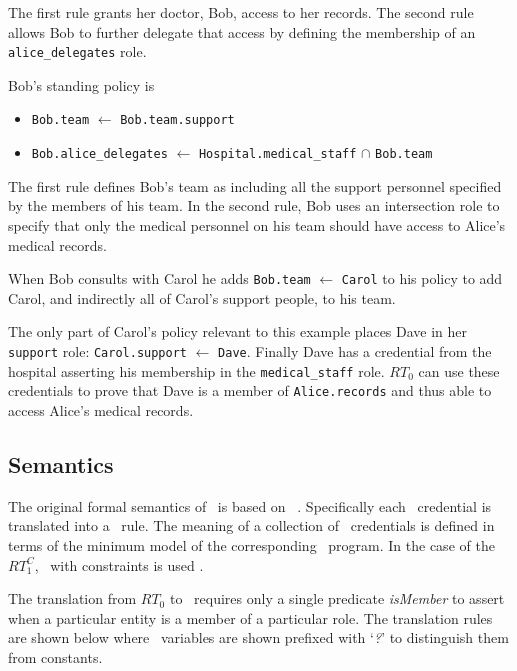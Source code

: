 The first rule grants her doctor, Bob, access to her records. The second rule allows Bob to
further delegate that access by defining the membership of an \texttt{alice\_delegates} role.

Bob's standing policy is

\begin{itemize}
\item \texttt{Bob.team} $\leftarrow$ \texttt{Bob.team.support}
\item \texttt{Bob.alice\_delegates} $\leftarrow$
  \texttt{Hospital.medical\_staff} $\cap$ \texttt{Bob.team}
\end{itemize}

The first rule defines Bob's team as including all the support personnel specified by the
members of his team. In the second rule, Bob uses an intersection role to specify that only the
medical personnel on his team should have access to Alice's medical records.

When Bob consults with Carol he adds \texttt{Bob.team} $\leftarrow$ \texttt{Carol} to his policy
to add Carol, and indirectly all of Carol's support people, to his team.

The only part of Carol's policy relevant to this example places Dave in her \texttt{support}
role: \texttt{Carol.support} $\leftarrow$ \texttt{Dave}. Finally Dave has a credential from the
hospital asserting his membership in the \texttt{medical\_staff} role. $RT_0$ can use these
credentials to prove that Dave is a member of \texttt{Alice.records} and thus able to access
Alice's medical records.

\subsection{Semantics}

The original formal semantics of \RT\ is based on \datalog\ \cite{Li:DRBTMF}. Specifically each
\RT\ credential is translated into a \datalog\ rule. The meaning of a collection of \RT\
credentials is defined in terms of the minimum model of the corresponding \datalog\ program. In
the case of the $RT_1^C$, \datalog\ with constraints is used \cite{Li:DCFTML}.

The translation from $RT_0$ to \datalog\ requires only a single predicate \textit{isMember} to
assert when a particular entity is a member of a particular role. The translation rules are
shown below where \datalog\ variables are shown prefixed with `\textit{?}' to distinguish them
from constants.

